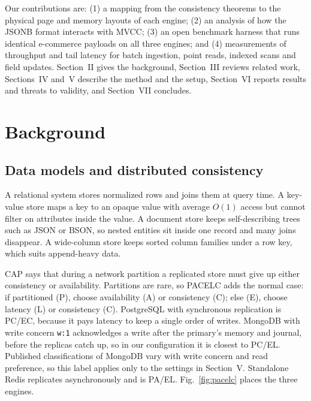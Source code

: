 \documentclass[conference,a4paper]{IEEEtran}
\newcommand{\code}[1]{\texttt{\small #1}}
\begin{document}
Our contributions are: (1) a mapping from the consistency theorems to the physical page and memory layouts of each engine; (2) an analysis of how the JSONB format interacts with MVCC; (3) an open benchmark harness that runs identical e-commerce payloads on all three engines; and (4) measurements of throughput and tail latency for batch ingestion, point reads, indexed scans and field updates. Section~II gives the background, Section~III reviews related work, Sections~IV and~V describe the method and the setup, Section~VI reports results and threats to validity, and Section~VII concludes.

\section{Background}
\subsection{Data models and distributed consistency}
A relational system stores normalized rows and joins them at query time. A key-value store maps a key to an opaque value with average $O(1)$ access but cannot filter on attributes inside the value. A document store keeps self-describing trees such as JSON or BSON, so nested entities sit inside one record and many joins disappear. A wide-column store keeps sorted column families under a row key, which suits append-heavy data.

CAP \cite{brewer2012} says that during a network partition a replicated store must give up either consistency or availability. Partitions are rare, so PACELC \cite{abadi2012} adds the normal case: if partitioned (P), choose availability (A) or consistency (C); else (E), choose latency (L) or consistency (C). PostgreSQL with synchronous replication is PC/EC, because it pays latency to keep a single order of writes. MongoDB with write concern \code{w:1} acknowledges a write after the primary's memory and journal, before the replicas catch up, so in our configuration it is closest to PC/EL. Published classifications of MongoDB vary with write concern and read preference, so this label applies only to the settings in Section~V. Standalone Redis replicates asynchronously and is PA/EL. Fig.~\ref{fig:pacelc} places the three engines.
\end{document}

